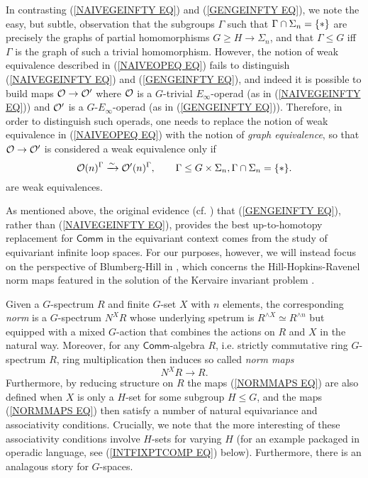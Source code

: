 \documentclass[a4paper,10pt]{article}%
\begin{document}
In contrasting 
(\ref{NAIVEGEINFTY EQ}) and (\ref{GENGEINFTY EQ}),
we note the easy, but subtle, observation that the subgroups $\Gamma$ such that $\Gamma \cap \Sigma_n = \{\**\}$ 
are precisely the graphs of partial homomorphisms 
$G \geq H \to \Sigma_n$,
and that $\Gamma \leq G$ iff $\Gamma$ is the graph of such a trivial homomorphism. 
However, the notion of weak equivalence described in (\ref{NAIVEOPEQ EQ}) fails to distinguish
(\ref{NAIVEGEINFTY EQ}) and (\ref{GENGEINFTY EQ}), 
and indeed it is possible
to build maps $\mathcal{O} \to \mathcal{O}'$ where
$\mathcal{O}$ is a $G$-trivial $E_{\infty}$-operad (as in (\ref{NAIVEGEINFTY EQ}))
and $\mathcal{O}'$ is a $G$-$E_{\infty}$-operad 
(as in (\ref{GENGEINFTY EQ})).
Therefore, in order to distinguish such operads, one needs to replace the notion of weak equivalence in (\ref{NAIVEOPEQ EQ}) 
with the notion of \textit{graph equivalence}, 
so that $\mathcal{O} \to \mathcal{O}'$ is considered a weak equivalence only if
\begin{equation}\label{GENEOPEQ EQ}
	\O(n)^{\Gamma} \xrightarrow{\sim} \O'(n)^{\Gamma}, \qquad
	\Gamma \leq G\times \Sigma_n, \Gamma \cap \Sigma_n = \{\**\}.
\end{equation}
are weak equivalences.


As mentioned above, the original evidence (cf. \cite{CW91}) 
that (\ref{GENGEINFTY EQ}), 
rather than (\ref{NAIVEGEINFTY EQ}), 
provides the best up-to-homotopy replacement for $\mathsf{Comm}$ in the equivariant context comes from the study of equivariant infinite loop spaces.
For our purposes, however, we will instead focus on the perspective of Blumberg-Hill in \cite{BH15},
which concerns the Hill-Hopkins-Ravenel norm maps featured in the solution of the Kervaire invariant problem \cite{HHR}.

Given a $G$-spectrum $R$ and finite $G$-set $X$ with $n$ elements, 
the corresponding \textit{norm} is a $G$-spectrum $N^X R$
whose underlying spetrum is 
$R^{\wedge X} \simeq R^{\wedge n}$
but equipped with a mixed $G$-action that combines the actions on $R$ and $X$ in the natural way.
Moreover, for any $\mathsf{Comm}$-algebra $R$, i.e. strictly commutative ring $G$-spectrum $R$, 
ring multiplication then induces so called \textit{norm maps}
\begin{equation}\label{NORMMAPS EQ}
	N^X R \to R.
\end{equation}
Furthermore, by reducing structure on $R$ the maps (\ref{NORMMAPS EQ}) are also defined when $X$ is only a $H$-set for some subgroup $H \leq G$, and the maps (\ref{NORMMAPS EQ})
then satisfy a number of 
natural equivariance and associativity conditions.
Crucially,  we note that the more interesting of these associativity conditions involve $H$-sets for varying $H$
(for an example packaged in operadic language,
see (\ref{INTFIXPTCOMP EQ}) below).
Furthermore, there is an analagous story for $G$-spaces.
\end{document}
